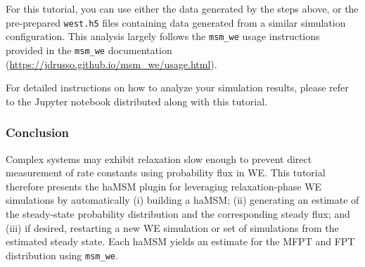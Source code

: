 For this tutorial, you can use either the data generated by the steps above, or the pre-prepared \verb|west.h5| files containing data generated from a similar simulation configuration. 
This analysis largely follows the \verb|msm_we| usage instructions provided in the \verb|msm_we| documentation ({\url{https://jdrusso.github.io/msm_we/usage.html}}).

For detailed instructions on how to analyze your simulation results, please refer to the Jupyter notebook distributed along with this tutorial.

\subsubsection{Conclusion}
Complex systems may exhibit relaxation slow enough to prevent direct measurement of rate constants using probability flux in WE. 
This tutorial therefore presents the haMSM plugin for leveraging relaxation-phase WE simulations by automatically (i) building a haMSM; (ii) generating an estimate of the steady-state probability distribution and the corresponding steady flux; and (iii) if desired, restarting a new WE simulation or set of simulations from the estimated steady state. 
Each haMSM yields an estimate for the MFPT and FPT distribution using \verb|msm_we|.